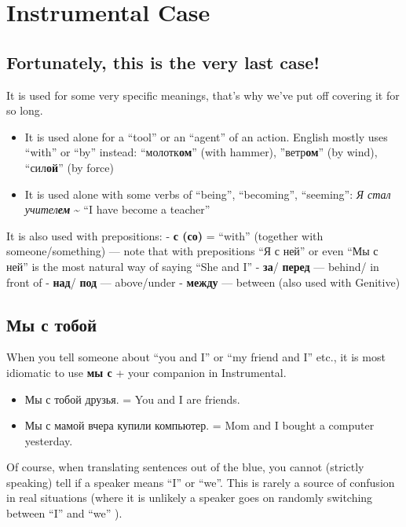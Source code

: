 \chapter{Instrumental Case}\label{instrumental-case}

\section{Fortunately, this is the very last
case!}\label{fortunately-this-is-the-very-last-case}

It is used for some very specific meanings, that's why we've put off
covering it for so long.

\begin{itemize}
\tightlist
\item
  It is used alone for a ``tool'' or an ``agent'' of an action. English
  mostly uses ``with'' or ``by'' instead: ``молотк\textbf{ом}'' (with
  hammer), ''ветр\textbf{ом}'' (by wind), ``сил\textbf{ой}'' (by force)
\item
  It is used alone with some verbs of ``being'', ``becoming'',
  ``seeming'': \emph{Я стал учител\textbf{ем}} \textasciitilde{} ``I
  have become a teacher''
\end{itemize}

It is also used with prepositions: - \textbf{с (со)} = ``with''
(together with someone/something) --- note that with prepositions ``Я с
ней'' or even ``Мы с ней'' is the most natural way of saying ``She and
I'' - \textbf{за}/ \textbf{перед} --- behind/ in front of -
\textbf{над}/ \textbf{под} --- above/under - \textbf{между} --- between
(also used with Genitive)

\section{Мы с
тобой}\label{ux43cux44b-ux441-ux442ux43eux431ux43eux439}

When you tell someone about ``you and I'' or ``my friend and I'' etc.,
it is most idiomatic to use \textbf{мы с} + your companion in
Instrumental.

\begin{itemize}
\tightlist
\item
  Мы с тобой друзья. = You and I are friends.
\item
  Мы с мамой вчера купили компьютер. = Mom and I bought a computer
  yesterday.
\end{itemize}

Of course, when translating sentences out of the blue, you cannot
(strictly speaking) tell if a speaker means ``I'' or ``we''. This is
rarely a source of confusion in real situations (where it is unlikely a
speaker goes on randomly switching between ``I'' and ``we'' ).

